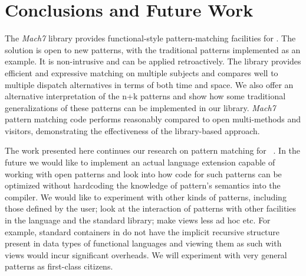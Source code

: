 \section{Conclusions and Future Work} %
\label{sec:cc}

The \emph{Mach7} library provides functional-style 
pattern-matching facilities for \Cpp{}. The solution is open to new patterns, 
with the traditional patterns implemented as an example. It is
non-intrusive and can be applied retroactively. %
The library provides efficient and expressive matching on multiple subjects and 
compares well to multiple dispatch alternatives in terms of both time and space.
We also offer an alternative interpretation of the n+k patterns and show how some 
traditional generalizations of these patterns can be implemented in our library. 
%
%
%
\emph{Mach7} pattern matching code performs reasonably compared to
open multi-methods and visitors, demonstrating the effectiveness of the 
library-based approach.

The work presented here continues our research on pattern matching for 
\Cpp{}~\cite{TS12}. In the future we would like to implement an actual language 
extension capable of working with open patterns and look into how code for such 
patterns can be optimized without hardcoding the knowledge of pattern's 
semantics into the compiler. 
We would like to experiment with other kinds of patterns, 
including those defined by the user; look at the interaction of patterns with 
other facilities in the language and the standard library; make
views less ad hoc etc. For example, standard containers in \Cpp{} do not have the 
implicit recursive structure present in data types of functional languages and 
viewing them as such with views would incur significant overheads. We will
experiment with very general patterns as first-class citizens.

